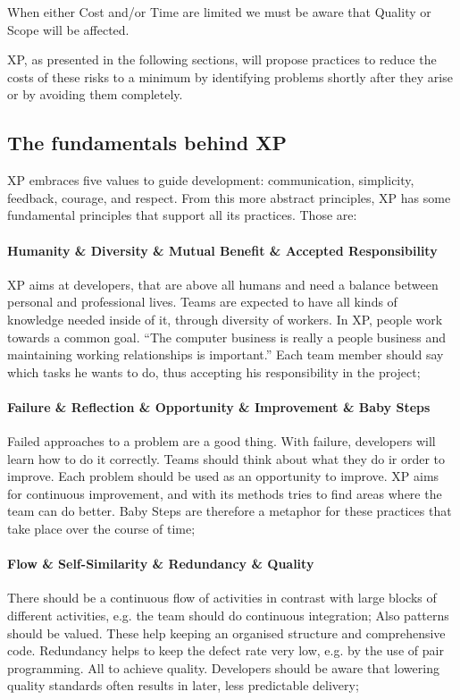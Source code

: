 \documentclass[conference]{IEEEtran}
\begin{document}
When either Cost and/or Time are limited we must be aware that Quality or Scope will be affected.

XP, as presented in the following sections, will propose practices to reduce the costs of these risks to a minimum by identifying problems shortly after they arise or by avoiding them completely.

\subsection{The fundamentals behind XP}
XP embraces five values to guide development: communication, simplicity, feedback, courage, and respect. From this more abstract principles, XP has some fundamental principles that support all its practices. Those are:
\paragraph{Humanity \& Diversity \& Mutual Benefit \& Accepted Responsibility} XP aims at developers, that are above all humans and need a balance between personal and professional lives. Teams are expected to have all kinds of knowledge needed inside of it, through diversity of workers. In XP, people work towards a common goal. ``The computer business is really a people business and maintaining working relationships is important.''\cite{Beck:2004tc} Each team member should say which tasks he wants to do, thus accepting his responsibility in the project;
\paragraph{Failure \& Reflection \& Opportunity \& Improvement \& Baby Steps} Failed approaches to a problem are a good thing. With failure, developers will learn how to do it correctly. Teams should think about what they do ir order to improve. Each problem should be used as an opportunity to improve.  XP aims for continuous improvement, and with its methods tries to find areas where the team can do better. Baby Steps are therefore a metaphor for these practices that take place over the course of time;
\paragraph{Flow \& Self-Similarity \& Redundancy \& Quality} There should be a continuous flow of activities in contrast with large blocks of different activities, e.g. the team should do continuous integration; Also patterns should be valued. These help keeping an organised structure and comprehensive code. Redundancy helps to keep the defect rate very low, e.g. by the use of pair programming. All to achieve quality. Developers should be aware that lowering quality standards often results in later, less predictable delivery;
\end{document}
